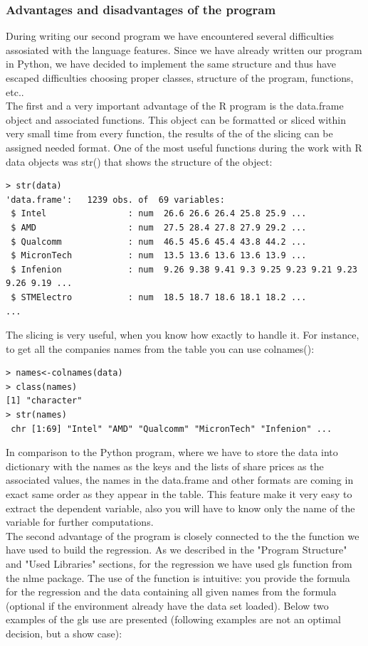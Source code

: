 \documentclass{article}
\begin{document}
\subsubsection{Advantages and disadvantages of the program}
During writing our second program we have encountered several difficulties assosiated with the language features. Since we have already written our program in Python, we have decided to implement the same structure and thus have escaped difficulties choosing proper classes, structure of the program, functions, etc..\\
The first and a very important advantage of the R program is the data.frame object and associated functions. This object can be formatted or sliced within very small time from every function, the results of the of the slicing can be assigned needed format. One of the most useful functions during the work with R data objects was str() that shows the structure of the object:
\begin{verbatim}
> str(data)
'data.frame':   1239 obs. of  69 variables:
 $ Intel                : num  26.6 26.6 26.4 25.8 25.9 ...
 $ AMD                  : num  27.5 28.4 27.8 27.9 29.2 ...
 $ Qualcomm             : num  46.5 45.6 45.4 43.8 44.2 ...
 $ MicronTech           : num  13.5 13.6 13.6 13.6 13.9 ...
 $ Infenion             : num  9.26 9.38 9.41 9.3 9.25 9.23 9.21 9.23 9.26 9.19 ...
 $ STMElectro           : num  18.5 18.7 18.6 18.1 18.2 ...
...
\end{verbatim}
The slicing is very useful, when you know how exactly to handle it. For instance, to get all the companies names from the table you can use colnames():
\begin{verbatim}
> names<-colnames(data)
> class(names)
[1] "character"
> str(names)
 chr [1:69] "Intel" "AMD" "Qualcomm" "MicronTech" "Infenion" ...
\end{verbatim} 
In comparison to the Python program, where we have to store the data into dictionary with the names as the keys and the lists of share prices as the associated values, the names in the data.frame and other formats are coming in exact same order as they appear in the table. This feature make it very easy to extract the dependent variable, also you will have to know only the name of the variable for further computations.\\
The second advantage of the program is closely connected to the the function we have used to build the regression. As we described in the "Program Structure" and "Used Libraries" sections, for the regression we have used gls function from the nlme package. The use of the function is intuitive: you provide the formula for the regression and the data containing all given names from the formula (optional if the environment already have the data set loaded). Below two examples of the gls use are presented (following examples are not an optimal decision, but a show case):
\end{document}
